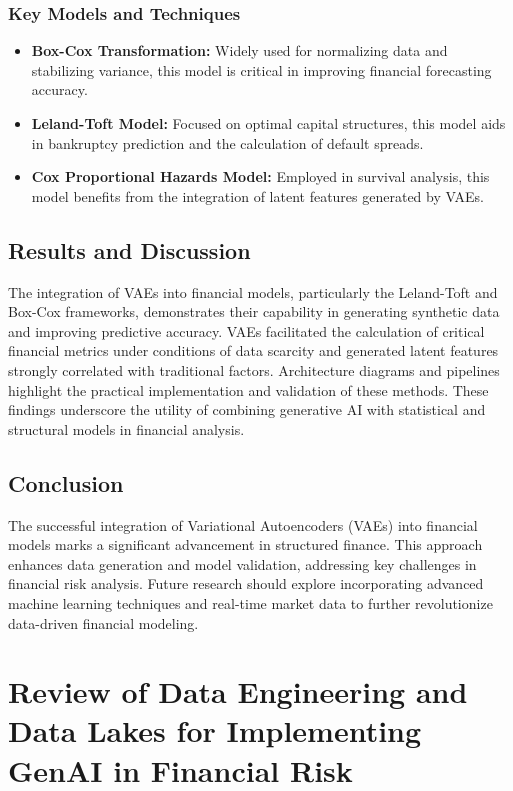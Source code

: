 \documentclass[a4paper,headinclude=on,footinclude=on,12pt,oneside]{scrbook}
\begin{document}
\subsection{Key Models and Techniques}
\begin{itemize}
	\item \textbf{Box-Cox Transformation:} Widely used for normalizing data and stabilizing variance, this model is critical in improving financial forecasting accuracy.
	\item \textbf{Leland-Toft Model:} Focused on optimal capital structures, this model aids in bankruptcy prediction and the calculation of default spreads.
	\item \textbf{Cox Proportional Hazards Model:} Employed in survival analysis, this model benefits from the integration of latent features generated by VAEs.
\end{itemize}

\section{Results and Discussion}
The integration of VAEs into financial models, particularly the Leland-Toft and Box-Cox frameworks, demonstrates their capability in generating synthetic data and improving predictive accuracy. VAEs facilitated the calculation of critical financial metrics under conditions of data scarcity and generated latent features strongly correlated with traditional factors. Architecture diagrams and pipelines highlight the practical implementation and validation of these methods. These findings underscore the utility of combining generative AI with statistical and structural models in financial analysis.

\section{Conclusion}
The successful integration of Variational Autoencoders (VAEs) into financial models marks a significant advancement in structured finance. This approach enhances data generation and model validation, addressing key challenges in financial risk analysis. Future research should explore incorporating advanced machine learning techniques and real-time market data to further revolutionize data-driven financial modeling.

\chapter{Review of Data Engineering and Data Lakes for Implementing GenAI in Financial Risk}
\end{document}
